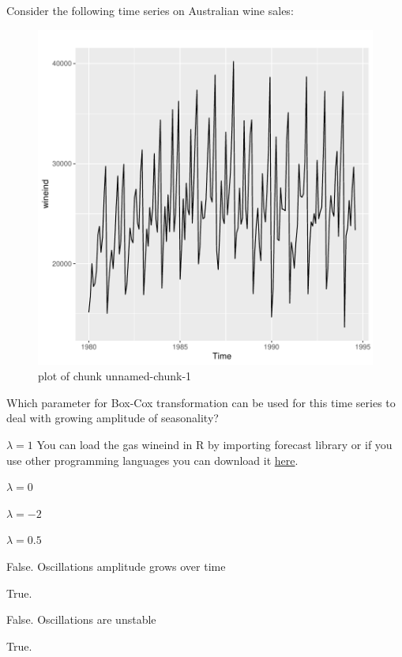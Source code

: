
\begin{question}
Consider the following time series on Australian wine sales:

\begin{figure}[H]
\centering
\includegraphics{unnamed-chunk-1-1-3.pdf}
\caption{plot of chunk unnamed-chunk-1}
\end{figure}

Which parameter for Box-Cox transformation can be used for this time series to deal with growing amplitude of seasonality?
\begin{answerlist}
  \item \(\lambda=1\) You can load the gas wineind in R by importing forecast library or if you use other programming languages you can download it \href{https://github.com/vincentarelbundock/Rdatasets/blob/master/csv/forecast/wineind.csv}{here}.
  \item \(\lambda=0\)
  \item \(\lambda=-2\)
  \item \(\lambda=0.5\)
\end{answerlist}
\end{question}

\begin{solution}
\begin{answerlist}
  \item False. Oscillations amplitude grows over time
  \item True.
  \item False. Oscillations are unstable
  \item True.
\end{answerlist}
\end{solution}

